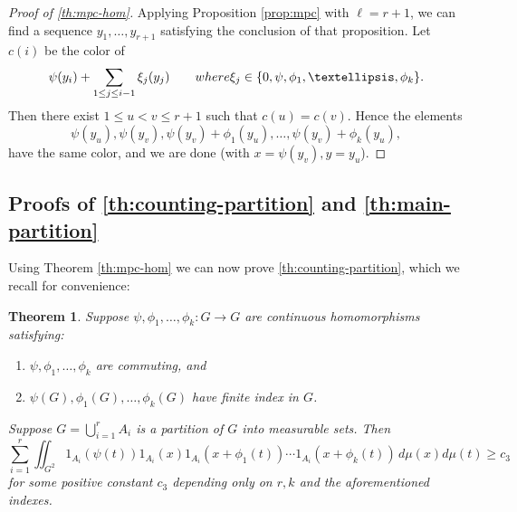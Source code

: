 \documentclass[10pt]{article}
\newtheorem*{theorem*}{Theorem}
\theoremstyle{definition}
\begin{document}
\begin{proof}[Proof of \cref{th:mpc-hom}]
Applying Proposition \ref{prop:mpc} with $\ell=r+1$, we can find a sequence $y_1, \ldots, y_{r+1}$ satisfying the conclusion of that proposition. Let $c(i)$ be the color of
\[
\psi(y_i) + \sum_{1 \leq j \leq i-1} \xi_j (y_j) \qquad \textup{ where } \xi_j \in \{ 0, \psi, \phi_1, \ldots, \phi_k \}.
\]
Then there exist $1 \leq u < v \leq r+1$ such that $c(u) = c(v)$. Hence the elements
\[
\psi(y_u), \psi(y_v), \psi(y_v) + \phi_1(y_u), \ldots, \psi(y_v) + \phi_k(y_u), 
\]
have the same color, and we are done (with $x=\psi(y_v), y=y_u$).
\end{proof}


\subsection{Proofs of \texorpdfstring{\cref{th:counting-partition}}{Theorem 1.11} and \texorpdfstring{\cref{th:main-partition}}{Theorem 1.5}}

Using Theorem \ref{th:mpc-hom} we can now prove \cref{th:counting-partition}, which we recall for convenience:

\begin{theorem*} 
Suppose $\psi, \phi_1, \ldots, \phi_k: G \to G$ are continuous homomorphisms satisfying:
\begin{enumerate}
\item $\psi, \phi_1, \ldots, \phi_k$ are commuting, and

\item $\psi(G), \phi_1(G), \ldots, \phi_k(G)$ have finite index in $G$.
\end{enumerate}
Suppose $G = \bigcup_{i=1}^r A_i$ is a partition of $G$ into measurable sets. Then 
\begin{equation*} 
\sum_{i=1}^r \iint_{G^2} 1_{A_i}(\psi(t)) 1_{A_i}(x) 1_{A_i}(x + \phi_1(t)) \cdots 1_{A_i}(x + \phi_k(t)) \, d \mu(x) d\mu(t) \geq c_3
\end{equation*} 
for some positive constant $c_3$ depending only on $r, k$ and the aforementioned indexes.
\end{theorem*}
\end{document}

